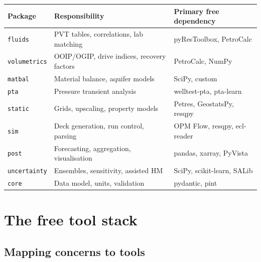\documentclass[11pt,a4paper]{article}
\begin{document}
\begin{longtable}{@{}p{3.3cm}p{4.2cm}p{7.4cm}@{}}
\toprule
\textbf{Package} & \textbf{Responsibility} & \textbf{Primary free dependency}\\
\midrule
\endhead
\texttt{fluids}      & PVT tables, correlations, lab matching & pyResToolbox, PetroCalc\\
\texttt{volumetrics} & OOIP/OGIP, drive indices, recovery factors & PetroCalc, NumPy\\
\texttt{matbal}      & Material balance, aquifer models & SciPy, custom\\
\texttt{pta}         & Pressure transient analysis & welltest-pta, pta-learn\\
\texttt{static}      & Grids, upscaling, property models & Petres, GeostatsPy, resqpy\\
\texttt{sim}         & Deck generation, run control, parsing & OPM Flow, resqpy, ecl-reader\\
\texttt{post}        & Forecasting, aggregation, visualisation & pandas, xarray, PyVista\\
\texttt{uncertainty} & Ensembles, sensitivity, assisted HM & SciPy, scikit-learn, SALib\\
\texttt{core}        & Data model, units, validation & pydantic, pint\\
\bottomrule
\end{longtable}

\section{The free tool stack}

\subsection{Mapping concerns to tools}
\end{document}
